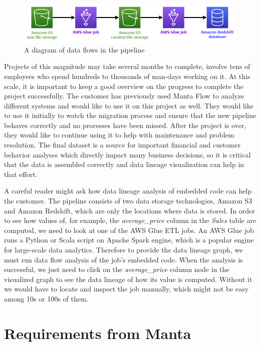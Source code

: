 \begin{figure}[ht]\centering
\includegraphics[width=1.0\textwidth]{img/pipeline_example.png}
\caption{A diagram of data flows in the pipeline}
\label{fig:pipelineExample}
\end{figure}

\par
Projects of this magnitude may take several months to complete, involve tens of employees who spend hundreds to thousands of man-days working on it. At this scale, it is important to keep a good overview on the progress to complete the project successfully. The customer has previously used Manta Flow to analyze different systems and would like to use it on this project as well. They would like to use it initially to watch the migration process and ensure that the new pipeline behaves correctly and no processes have been missed. After the project is over, they would like to continue using it to help with maintenance and problem resolution. The final dataset is a source for important financial and customer behavior analyses which directly impact many business decisions, so it is critical that the data is assembled correctly and data lineage visualization can help in that effort.
\par
A careful reader might ask how data lineage analysis of embedded code can help the customer. The pipeline consists of two data storage technologies, Amazon S3 and Amazon Redshift, which are only the locations where data is stored. In order to see how values of, for example, the \textit{average\_price} column in the \textit{Sales} table are computed, we need to look at one of the AWS Glue ETL jobs. An AWS Glue job runs a Python or Scala script on Apache Spark engine, which is a popular engine for large-scale data analytics. Therefore to provide the data lineage graph, we must run data flow analysis of the job's embedded code. When the analysis is successful, we just need to click on the \textit{average\_price} column node in the visualized graph to see the data lineage of how its value is computed. Without it we would have to locate and inspect the job manually, which might not be easy among 10s or 100s of them.

\section{Requirements from Manta}

